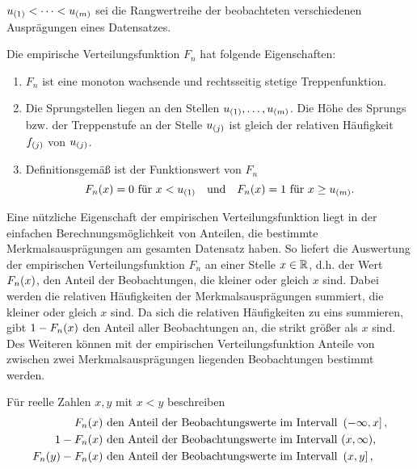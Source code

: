 \documentclass{lecture}
\begin{document}
    \begin{calcrule}
        \(u_{\parentheses*{1}} < \cdots < u_{\parentheses*{m}}\) sei die Rangwertreihe der beobachteten verschiedenen Ausprägungen eines Datensatzes.

        Die empirische Verteilungsfunktion \(F_n\) hat folgende Eigenschaften:
        \begin{enumerate}
            \item \(F_n\) ist eine monoton wachsende und rechtsseitig stetige Treppenfunktion.
            \item Die Sprungstellen liegen an den Stellen \(u_{\parentheses*{1}}, \ldots, u_{\parentheses*{m}}\).
            Die Höhe des Sprungs bzw. der Treppenstufe an der Stelle \(u_{\parentheses*{j}}\) ist gleich der relativen Häufigkeit \(f_{\parentheses*{j}}\) von \(u_{\parentheses*{j}}\).
            \item Definitionsgemäß ist der Funktionswert von \(F_n\)
            \[
                F_n\parentheses*{x} = 0\text{ für }x < u_{\parentheses*{1}} \quad \text{und} \quad F_n\parentheses*{x} = 1\text{ für }x \ge u_{\parentheses*{m}}.
            \]
        \end{enumerate}
    \end{calcrule}

    Eine nützliche Eigenschaft der empirischen Verteilungsfunktion liegt in der einfachen Berechnungsmöglichkeit von Anteilen, die bestimmte Merkmalsausprägungen am gesamten Datensatz haben.
    So liefert die Auswertung der empirischen Verteilungsfunktion \(F_n\) an einer Stelle \(x \in \R\), d.h. der Wert \(F_n\parentheses*{x}\), den Anteil der Beobachtungen, die kleiner oder gleich \(x\) sind.
    Dabei werden die relativen Häufigkeiten der Merkmalsausprägungen summiert, die kleiner oder gleich \(x\) sind.
    Da sich die relativen Häufigkeiten zu eins summieren, gibt \(1 - F_n\parentheses*{x}\) den Anteil aller Beobachtungen an, die strikt größer als \(x\) sind.
    Des Weiteren können mit der empirischen Verteilungsfunktion Anteile von zwischen zwei Merkmalsausprägungen liegenden Beobachtungen bestimmt werden.

    \begin{calcrule}
        Für reelle Zahlen \(x, y\) mit \(x < y\) beschreiben
        \begin{align*}
            F_n\parentheses*{x} & \text{ den Anteil der Beobachtungswerte im Intervall }\left(-\infty, x\right],\\
            1 - F_n\parentheses*{x} & \text{ den Anteil der Beobachtungswerte im Intervall }\parentheses*{x, \infty},\\
            F_n\parentheses*{y} - F_n\parentheses*{x} & \text{ den Anteil der Beobachtungswerte im Intervall }\left(x, y\right],\\
        \end{align*}
    \end{calcrule}
\end{document}
